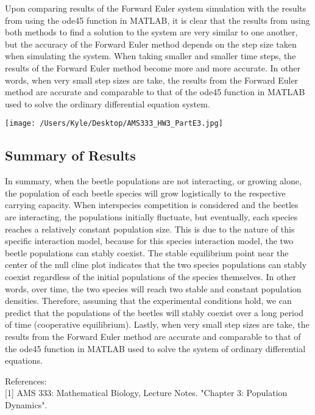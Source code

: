 \documentclass[12pt]{article}
\begin{document}
Upon comparing results of the Forward Euler system simulation with the results from using the ode45 function in MATLAB, it is clear that the results from using both methods to find a solution to the system are very similar to one another, but the accuracy of the Forward Euler method depends on the step size taken when simulating the system. When taking smaller and smaller time steps, the results of the Forward Euler method become more and more accurate. In other words, when very small step sizes are take, the results from the Forward Euler method are accurate and comparable to that of the ode45 function in MATLAB used to solve the ordinary differential equation system.

\begin{center}
   \texttt{[image: /Users/Kyle/Desktop/AMS333\_HW3\_PartE3.jpg]}
\end{center}


\subsection*{Summary of Results}
In summary, when the beetle populations are not interacting, or growing alone, the population of each beetle species will grow logistically to the respective carrying capacity. When interspecies competition is considered and the beetles are interacting, the populations initially fluctuate, but eventually, each species reaches a relatively constant population size. This is due to the nature of this specific interaction model, because for this species interaction model, the two beetle populations can stably coexist. The stable equilibrium point near the center of the null cline plot indicates that the two species populations can stably coexist regardless of the initial populations of the species themselves. In other words, over time, the two species will reach two stable and constant population densities. Therefore, assuming that the experimental conditions hold, we can predict that the populations of the beetles will stably coexist over a long period of time (cooperative equilibrium). Lastly, when very small step sizes are take, the results from the Forward Euler method are accurate and comparable to that of the ode45 function in MATLAB used to solve the system of ordinary differential equations.

 
 \vspace{1cm}

%
%

\begin{flushleft}
References:\\


[1] AMS 333: Mathematical Biology, Lecture Notes. "Chapter 3: Population Dynamics".


\end{flushleft}
\end{document}
